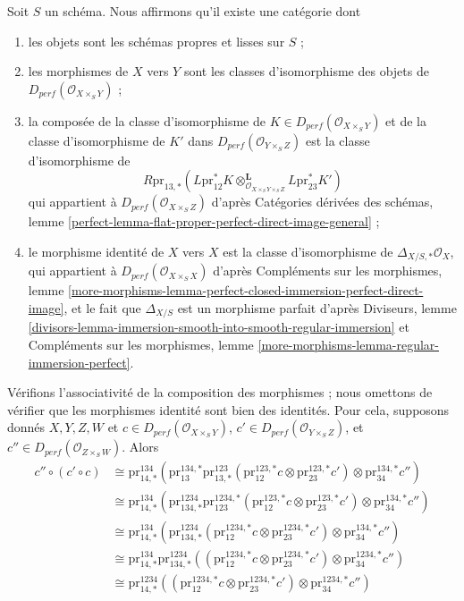 \noindent
Soit $S$ un schéma. Nous affirmons qu'il existe une catégorie
dont
\begin{enumerate}
\item les objets sont les schémas propres et lisses sur $S$ ;
\item les morphismes de $X$ vers $Y$ sont les classes d'isomorphisme
des objets de $D_{perf}(\mathcal{O}_{X \times_S Y})$ ;
\item la composée de la classe d'isomorphisme de
$K \in D_{perf}(\mathcal{O}_{X \times_S Y})$
et de la classe d'isomorphisme de $K'$ dans $D_{perf}(\mathcal{O}_{Y \times_S Z})$
est la classe d'isomorphisme de
$$
R\text{pr}_{13, *}(
L\text{pr}_{12}^*K
\otimes_{\mathcal{O}_{X \times_S Y \times_S Z}}^\mathbf{L}
L\text{pr}_{23}^*K')
$$
qui appartient à $D_{perf}(\mathcal{O}_{X \times_S Z})$ d'après
Catégories dérivées des schémas, lemme
\ref{perfect-lemma-flat-proper-perfect-direct-image-general} ;
\item le morphisme identité de $X$ vers $X$ est la
classe d'isomorphisme de $\Delta_{X/S, *}\mathcal{O}_X$,
qui appartient à $D_{perf}(\mathcal{O}_{X \times_S X})$
d'après Compléments sur les morphismes, lemme
\ref{more-morphisms-lemma-perfect-closed-immersion-perfect-direct-image},
et le fait que $\Delta_{X/S}$ est un morphisme parfait d'après
Diviseurs, lemme
\ref{divisors-lemma-immersion-smooth-into-smooth-regular-immersion} et
Compléments sur les morphismes, lemme \ref{more-morphisms-lemma-regular-immersion-perfect}.
\end{enumerate}
Vérifions l'associativité de la composition
des morphismes ; nous omettons de vérifier que les morphismes identité
sont bien des identités. Pour cela, supposons donnés
$X, Y, Z, W$ et
$c \in D_{perf}(\mathcal{O}_{X \times_S Y})$,
$c' \in D_{perf}(\mathcal{O}_{Y \times_S Z})$, et
$c'' \in D_{perf}(\mathcal{O}_{Z \times_S W})$. Alors
\begin{align*}
c'' \circ (c' \circ c)
& \cong
\text{pr}^{134}_{14, *}(
\text{pr}^{134, *}_{13}
\text{pr}^{123}_{13, *}(\text{pr}^{123, *}_{12}c \otimes
\text{pr}^{123, *}_{23}c')
\otimes \text{pr}^{134, *}_{34}c'') \\
& \cong
\text{pr}^{134}_{14, *}(
\text{pr}^{1234}_{134, *}
\text{pr}^{1234, *}_{123}(\text{pr}^{123, *}_{12}c \otimes
\text{pr}^{123, *}_{23}c')
\otimes \text{pr}^{134, *}_{34}c'') \\
& \cong
\text{pr}^{134}_{14, *}(
\text{pr}^{1234}_{134, *}
(\text{pr}^{1234, *}_{12}c \otimes
\text{pr}^{1234, *}_{23}c')
\otimes \text{pr}^{134, *}_{34}c'') \\
& \cong
\text{pr}^{134}_{14, *}
\text{pr}^{1234}_{134, *}
((\text{pr}^{1234, *}_{12}c \otimes
\text{pr}^{1234, *}_{23}c')
\otimes \text{pr}^{1234, *}_{34}c'') \\
& \cong
\text{pr}^{1234}_{14, *}(
(\text{pr}^{1234, *}_{12}c \otimes
\text{pr}^{1234, *}_{23}c') \otimes
\text{pr}^{1234, *}_{34}c'')
\end{align*}

